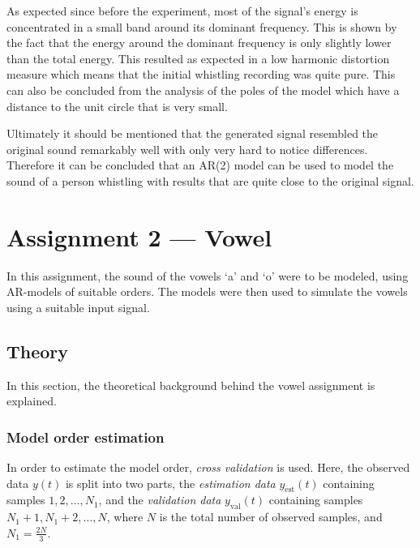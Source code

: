 \documentclass{IEEEtran}
\newcommand{\val}[1]{#1_{\text{val}}}
\newcommand{\est}[1]{#1_{\text{est}}}
\begin{document}
As expected since before the experiment, most of the signal's energy
is concentrated in a small band around its dominant frequency. This
is shown by the fact that the energy around the dominant frequency is
only slightly lower than the total energy. This resulted as expected
in a low harmonic distortion measure which means that the initial
whistling recording was quite pure. This can also be concluded from
the analysis of the poles of the model which have a distance to the
unit circle that is very small.

Ultimately it should be mentioned that the generated signal resembled the
original sound remarkably well with only very hard to notice
differences. Therefore it can be concluded that an AR(2) model can
be used to model the sound of a person whistling with results that
are quite close to the original signal.

\section{Assignment 2 --- Vowel}

In this assignment, the sound of the vowels `a' and `o' were to be
modeled, using AR-models of suitable orders. The models were then
used to simulate the vowels using a suitable input signal.

\subsection{Theory}
\label{sub:voweltheory}

In this section, the theoretical background behind the vowel assignment is
explained.

\subsubsection{Model order estimation}
\label{ssub:modelorderestimation}

In order to estimate the model order, \textit{cross validation} is used.
Here, the observed data $y(t)$ is split into two
parts, the \textit{estimation data} $\est{y}(t)$ containing samples $1,
2,\ldots,N_1$, and
the \textit{validation data} $\val{y}(t)$ containing samples $N_1 + 1, N_1 + 2,
\ldots,N$,
where $N$ is the total number of observed
samples, and $N_1 = \frac{2N}{3}$.
\end{document}
